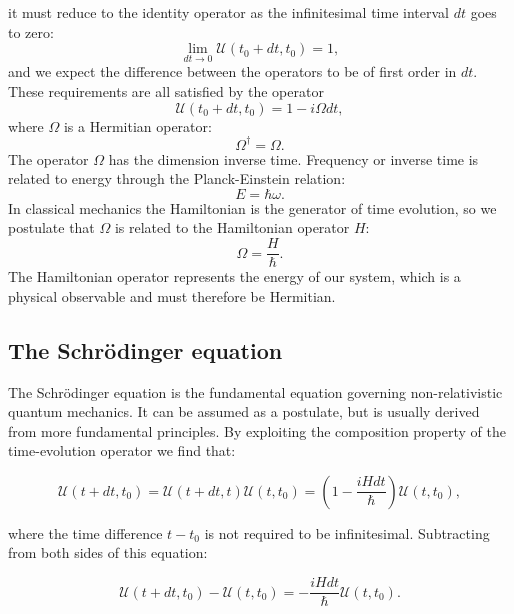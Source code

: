 it must reduce to the identity operator as the infinitesimal
time interval $dt$ goes to zero:
\begin{equation}
 \lim_{dt \rightarrow 0} \mathcal{U}(t_0 + dt, t_0) = 1,
\end{equation}
and we expect the difference between the operators
to be of first order in $dt$.
\newline
These requirements are all satisfied by the operator
\begin{equation}
 \mathcal{U}(t_0 + dt, t_0) = 1 - i\Omega dt ,
\end{equation}
where $\Omega$ is a Hermitian operator:
\begin{equation}
 \Omega^{\dagger} = \Omega .
\end{equation}
The operator $\Omega$ has the dimension inverse time.
Frequency or inverse time is related to energy
through the Planck-Einstein relation:
\begin{equation}
 E = \hbar \omega .
\end{equation}
In classical mechanics the Hamiltonian is the generator of time evolution,
so we postulate that $\Omega$ is related to the Hamiltonian operator
$H$:
\begin{equation}
 \Omega = \frac{H}{\hbar} .
\end{equation}
The Hamiltonian operator represents the energy of our system,
which is a physical observable and must therefore be Hermitian.

\subsection{The Schr\"{o}dinger equation}
The Schr\"{o}dinger equation is the fundamental equation
governing non-relativistic quantum mechanics. It can be assumed
as a postulate, but is usually derived from more fundamental
principles.
By exploiting the composition property of the time-evolution
operator we find that:

\begin{equation}
 \mathcal{U}(t + dt, t_0) = \mathcal{U}(t + dt, t)
    \mathcal{U}(t, t_0) = (1 - \frac{i H dt}{\hbar})
    \mathcal{U}(t, t_0) ,
\end{equation}

where the time difference $t - t_0$ is not required to be infinitesimal.
Subtracting from both sides of this equation:

\begin{equation}
 \mathcal{U}(t + dt, t_0) - \mathcal{U}(t, t_0) =
    -\frac{iHdt}{\hbar} \mathcal{U}(t, t_0) .
\end{equation}

